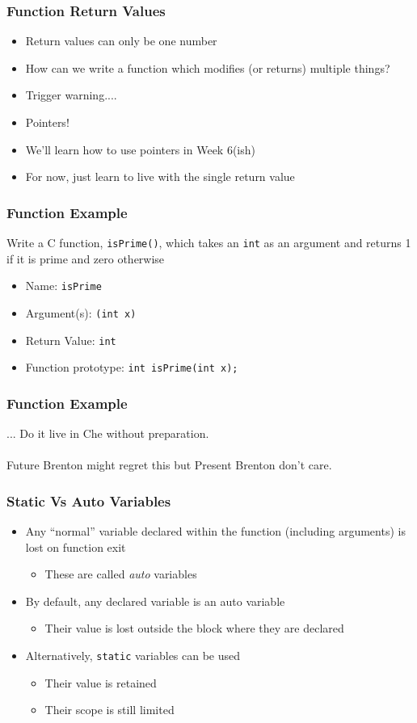\documentclass[14pt]{beamer}
\begin{document}
\begin{frame}
\frametitle{Function Return Values}
\begin{itemize}
\item Return values can only be one number
\item How can we write a function which modifies (or returns) multiple things?
\pause
\item Trigger warning....
\pause
\item Pointers!
\pause
\item We'll learn how to use pointers in Week 6(ish)
\item For now, just learn to live with the single return value
\end{itemize}
\end{frame}

\begin{frame}
\frametitle{Function Example}
Write a C function, \texttt{isPrime()}, which takes an \texttt{int} as an argument and returns 1 if it is prime and zero otherwise
\begin{itemize}
\item Name: \texttt{isPrime}
\item Argument(s): \texttt{(int x)}
\item Return Value: \texttt{int}
\pause
\item Function prototype: \texttt{int~isPrime(int~x);}
\end{itemize}
\end{frame}

\begin{frame}
\frametitle{Function Example}
\begin{center}
... Do it live in Che without preparation.\\~\\Future Brenton might regret this but Present Brenton don't care.
\end{center}
\end{frame}

\begin{frame}
\frametitle{Static Vs Auto Variables}
\begin{itemize}
\item Any ``normal'' variable declared within the function (including arguments) is lost on function exit
	\begin{itemize}
		\item These are called \textit{auto} variables
	\end{itemize}
\item By default, any declared variable is an auto variable
	\begin{itemize}
		\item Their value is lost outside the block where they are declared
	\end{itemize}
\pause
\item Alternatively, \texttt{static} variables can be used
 \begin{itemize}
 	\pause
 	\item Their value is retained
 	\pause
 	\item Their scope is still limited
 \end{itemize}
\end{itemize}
\end{frame}
\end{document}
